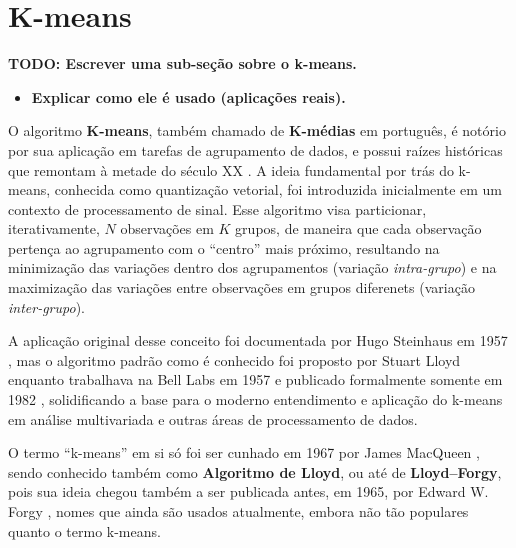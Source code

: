 \documentclass[12pt,
openright, 
oneside, %
a4paper,    %
brazil]{facom-ufu-abntex2}
\begin{document}

\section{K-means}
\label{sec:kMeans}


\textbf{TODO: Escrever uma sub-seção sobre o k-means.}

\begin{itemize}
  \item \textbf{Explicar como ele é usado (aplicações reais).}
\end{itemize}

O algoritmo \textbf{K-means}, também chamado de \textbf{K-médias} em português, é notório por sua aplicação em tarefas de agrupamento de dados, e possui raízes históricas que remontam à metade do século XX \cite{kMeansHistoryBock2007}. A ideia fundamental por trás do k-means, conhecida como quantização vetorial, foi introduzida inicialmente em um contexto de processamento de sinal. Esse algoritmo visa particionar, iterativamente, $N$ observações em $K$ grupos, de maneira que cada observação pertença ao agrupamento com o \enquote{centro} mais próximo, resultando na minimização das variações dentro dos agrupamentos (variação \textit{intra-grupo}) e na maximização das variações entre observações em grupos diferenets (variação \textit{inter-grupo}).

A aplicação original desse conceito foi documentada por Hugo Steinhaus em 1957 \cite{kMeansFirstIdeaSteinhaus1957}, mas o algoritmo padrão como é conhecido foi proposto por Stuart Lloyd enquanto trabalhava na Bell Labs em 1957 e publicado formalmente somente em 1982 \cite{kMeansFirstAlgoLloyd1982}, solidificando a base para o moderno entendimento e aplicação do k-means em análise multivariada e outras áreas de processamento de dados.

O termo \enquote{k-means} em si só foi ser cunhado em 1967 por James MacQueen \cite{kMeansCoinedMacQueen1967}, sendo conhecido também como \textbf{Algoritmo de Lloyd}, ou até de \textbf{Lloyd--Forgy}, pois sua ideia chegou também a ser publicada antes, em 1965, por Edward W. Forgy \cite{kMeansFirst2AlgoForgy1965}, nomes que ainda são usados atualmente, embora não tão populares quanto o termo k-means.
\end{document}
